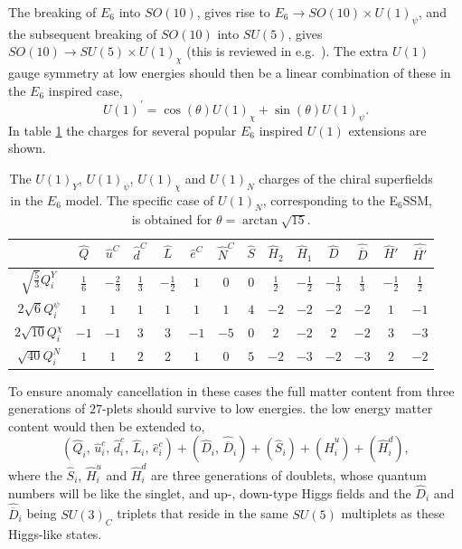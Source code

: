\documentclass[preprint,amsmath,amssymb,aps,superscriptaddress,prd,showpacs,floatfix,nofootinbib]{revtex4-1}
\newcommand{\be}{\begin{equation}}
\newcommand{\ee}{\end{equation}}
\begin{document}
The breaking of $E_6$ into $SO(10)$, gives rise to $E_6\to
SO(10)\times U(1)_{\psi}$, and the subsequent breaking of $SO(10)$
into $SU(5)$, gives $SO(10)\to SU(5)\times U(1)_{\chi}$ (this is
reviewed in e.g.~\cite{Langacker:2008yv}). The extra $U(1)$ gauge
symmetry at low energies should then be a linear combination of these
in the $E_6$ inspired case, \be U(1)^\prime = \cos(\theta) U(1)_{\chi}
+ \sin(\theta) U(1)_{\psi}.  \ee In table \ref{tab:E6charges} the
charges for several popular $E_6$ inspired $U(1)$ extensions are
shown.
\begin{table}[h]
\centering
\begin{ruledtabular}
\begin{tabular}{cccccccccccccc}
 & $\hat{Q}$ & $\hat{u}^C$ & $\hat{d}^C$ & $\hat{L}$ & $\hat{e}^C$ & $\hat{N}^C$ & $\hat{S}$ & $\hat{H}_2$ & $\hat{H}_1$ & $\hat{D}$ & $\hat{\overline{D}}$ & $\hat{H}'$ & $\hat{\overline{H'}}$ \\[1mm]
\hline
$\sqrt{\frac{5}{3}}Q_i^Y$ & $\frac{1}{6}$ & $-\frac{2}{3}$ & $\frac{1}{3}$ & $-\frac{1}{2}$ & $1$ & $0$ & $0$ & $\frac{1}{2}$ & $-\frac{1}{2}$ & $-\frac{1}{3}$ & $\frac{1}{3}$ & $-\frac{1}{2}$ & $\frac{1}{2}$ \\[1mm]
$2\sqrt{6}Q_i^\psi$ & $1$ & $1$ & $1$ & $1$ & $1$ & $1$ & $4$ & $-2$ & $-2$ & $-2$ & $-2$ & $1$ & $-1$\\[1mm]
$2\sqrt{10}Q_i^\chi$ & $-1$ & $-1$ & $3$ & $3$ & $-1$ & $-5$ & $0$ & $2$ & $-2$ & $2$ & $-2$ & $3$ & $-3$\\[1mm]
$\sqrt{40}Q_i^N$ & $1$ & $1$ & $2$ & $2$ & $1$ & $0$ & $5$ & $-2$ & $-3$ & $-2$ & $-3$ & $2$ & $-2$ \\[1mm]
\end{tabular}
\end{ruledtabular}
\caption{The $U(1)_Y$, $U(1)_\psi$, $U(1)_\chi$ and $U(1)_N$ charges of the chiral superfields in the $E_6$ model. The specific case of $U(1)_N$, corresponding to the E$_6$SSM, is obtained for $\theta=\arctan\sqrt{15}$.}
\label{tab:E6charges}
\end{table}

To ensure anomaly cancellation in these cases the full matter content
from three generations of $27$-plets should survive to low energies.
the low energy matter content would then be extended to, \be
(\hat{Q}_i,\,\hat{u}^c_i,\,\hat{d}^c_i,\,\hat{L}_i,\,\hat{e}^c_i)
+(\hat{D}_i,\,\hat{\overline{D}}_i)+(\hat{S}_{i})+(\hat{H}^u_i)+(\hat{H}^d_i),\ee
where the $\hat{S}_{i}$, $\hat{H}^u_i$ and $\hat{H}^d_i$ are three
generations of doublets, whose quantum numbers will be like the
singlet, and up-, down-type Higgs fields and the $\hat{D}_i$ and
$\hat{\overline{D}}_i$ being $SU(3)_C$ triplets that reside in the
same $SU(5)$ multiplets as these Higgs-like states.
\end{document}
